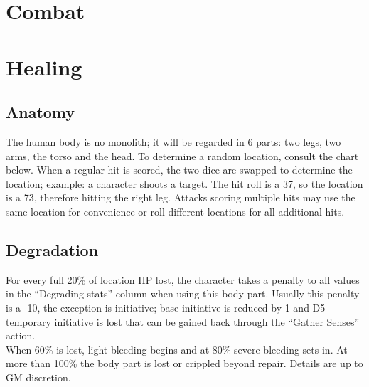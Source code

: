 \documentclass[12pt,a4paper,openany]{book}
\begin{document}
	\chapter{Combat}
	
	
	
	

	\chapter{Healing}
	\section{Anatomy}
	The human body is no monolith; it will be regarded in 6 parts: two legs, two arms, the torso and the head. To determine a random location, consult the chart below. When a regular hit is scored, the two dice are swapped to determine the location; example: a character shoots a target. The hit roll is a 37, so the location is a 73, therefore hitting the right leg. Attacks scoring multiple hits may use the same location for convenience or roll different locations for all additional hits.
	\section{Degradation}
	For every full 20\% of location HP lost, the character takes a penalty to all values in the “Degrading stats” column when using this body part. Usually this penalty is a -10, the exception is initiative; base initiative is reduced by 1 and D5 temporary initiative is lost that can be gained back through the “Gather Senses” action.\\
	When 60\% is lost, light bleeding begins and at 80\% severe bleeding sets in. At more than 100\% the body part is lost or crippled beyond repair. Details are up to GM discretion.
\end{document}
